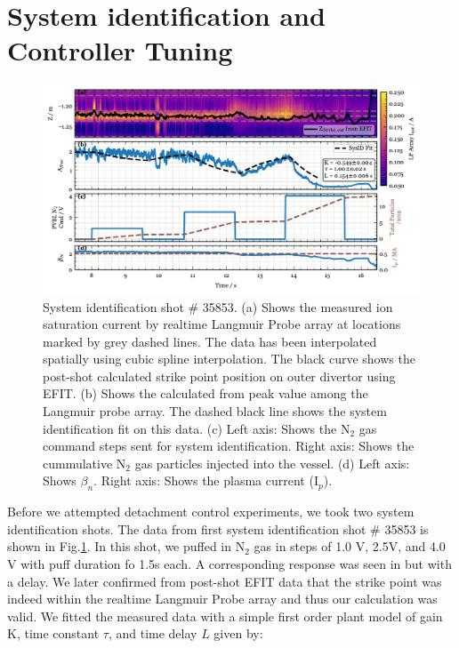 \section{System identification and Controller Tuning}
\label{sec:sysid}





\begin{figure}[!ht]
 \centering
 \includegraphics[width=\textwidth]{figures/DetCtrl_2D_35853.pdf}
 \caption{System identification shot \# 35853.
(a) Shows the measured ion saturation current by realtime Langmuir Probe array at locations marked by grey dashed lines.
The data has been interpolated spatially using cubic spline interpolation.
The black curve shows the post-shot calculated strike point position on outer divertor using EFIT.
(b) Shows the \Afrac calculated from peak value among the Langmuir probe array.
The dashed black line shows the system identification fit on this data.
(c) Left axis: Shows the N$_2$ gas command steps sent for system identification.
Right axis: Shows the cummulative N$_2$ gas particles injected into the vessel.
(d) Left axis: Shows $\beta_n$.
Right axis: Shows the plasma current (I$_p$).}
 \label{fig:sysid_afrac}
\end{figure}

Before we attempted detachment control experiments, we took two system identification shots.
The data from first system identification shot \# 35853 is shown in Fig.\ref{fig:sysid_afrac}.
In this shot, we puffed in N$_2$ gas in steps of 1.0 V, 2.5V, and 4.0 V with puff duration fo 1.5s each.
A corresponding response was seen in \Afrac but with a delay.
We later confirmed from post-shot EFIT data that the strike point was indeed within the realtime Langmuir Probe array and thus our \Afrac calculation was valid.
We fitted the measured data with a simple first order plant model of gain K, time constant $\tau$, and time delay $L$ given by:

